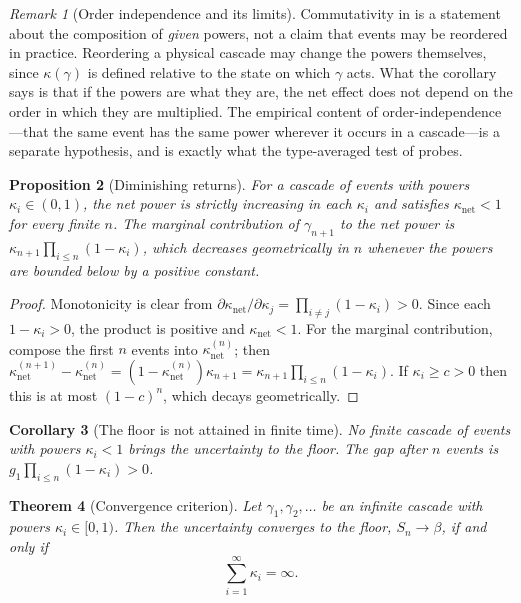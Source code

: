 \documentclass[11pt,a4paper]{article}
\theoremstyle{thmstyle}
\newtheorem{theorem}{Theorem}[section]
\newtheorem{proposition}[theorem]{Proposition}
\newtheorem{corollary}[theorem]{Corollary}
\theoremstyle{definition}
\theoremstyle{remark}
\newtheorem{remark}[theorem]{Remark}
\newcommand{\flo}{\beta}
\newcommand{\kap}{\kappa}
\begin{document}
\begin{remark}[Order independence and its limits]
\label{rem:order-indep}
Commutativity in  is a statement about the composition
of \emph{given} powers, not a claim that events may be reordered in
practice. Reordering a physical cascade may change the powers themselves,
since $\kap(\gamma)$ is defined relative to the state on which $\gamma$
acts. What the corollary says is that if the powers are what they are, the
net effect does not depend on the order in which they are multiplied. The
empirical content of order-independence---that the same event has the same
power wherever it occurs in a cascade---is a separate hypothesis, and is
exactly what the type-averaged test of  probes.
\end{remark}

\begin{proposition}[Diminishing returns]
\label{prop:diminishing}
For a cascade of events with powers $\kap_i\in(0,1)$, the net power is
strictly increasing in each $\kap_i$ and satisfies
$\kap_{\mathrm{net}}<1$ for every finite $n$. The marginal contribution of
$\gamma_{n+1}$ to the net power is
$\kap_{n+1}\prod_{i\le n}(1-\kap_i)$, which decreases geometrically in $n$
whenever the powers are bounded below by a positive constant.
\end{proposition}

\begin{proof}
Monotonicity is clear from
$\partial\kap_{\mathrm{net}}/\partial\kap_j=\prod_{i\ne j}(1-\kap_i)>0$.
Since each $1-\kap_i>0$, the product is positive and $\kap_{\mathrm{net}}<1$.
For the marginal contribution, compose the first $n$ events into
$\kap_{\mathrm{net}}^{(n)}$; then
$\kap_{\mathrm{net}}^{(n+1)}-\kap_{\mathrm{net}}^{(n)}
=(1-\kap_{\mathrm{net}}^{(n)})\kap_{n+1}
=\kap_{n+1}\prod_{i\le n}(1-\kap_i)$. If $\kap_i\ge c>0$ then this is at
most $(1-c)^{n}$, which decays geometrically.
\end{proof}

\begin{corollary}[The floor is not attained in finite time]
\label{cor:not-attained}
No finite cascade of events with powers $\kap_i<1$ brings the uncertainty to
the floor. The gap after $n$ events is $g_1\prod_{i\le n}(1-\kap_i)>0$.
\end{corollary}

\begin{theorem}[Convergence criterion]
\label{thm:convergence}
Let $\gamma_1,\gamma_2,\dots$ be an infinite cascade with powers
$\kap_i\in[0,1)$. Then the uncertainty converges to the floor,
$S_n\to\flo$, if and only if
\[
\sum_{i=1}^{\infty}\kap_i=\infty .
\]
\end{theorem}
\end{document}
